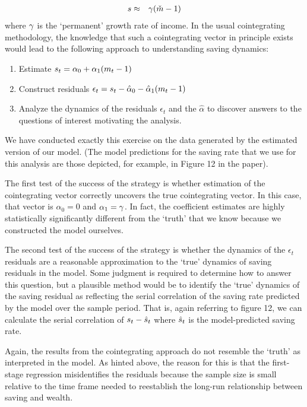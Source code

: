\begin{eqnarray}
  s & \approx & \gamma (\check{m}-1)
\end{eqnarray}
where $\gamma$ is the `permanent' growth rate of income.  In the usual cointegrating methodology, the knowledge
that such a cointegrating vector in principle exists would lead to the following approach to
understanding saving dynamics:
\begin{enumerate}
\item Estimate $s_{t} = \alpha_{0} + \alpha_{1} (m_{t}-1)$
\item Construct residuals $\epsilon_{t} = s_{t} - \hat{\alpha}_{0} - \hat{\alpha}_{1} (m_{t}-1)$
\item Analyze the dynamics of the residuals $\epsilon_{t}$ and the $\hat{\alpha}$ to discover answers to the questions
of interest motivating the analysis.
\end{enumerate}

We have conducted exactly this exercise on the data generated by the estimated version of our model.  (The model predictions for
the saving rate that we use for this analysis are those depicted, for example, in Figure 12 in the paper).

The first test of the success of the strategy is whether estimation of the cointegrating vector correctly uncovers the
true cointegrating vector.  In this case, that vector is $\alpha_{0}=0$ and $\alpha_{1} = \gamma$.  In fact, the
coefficient estimates are highly statistically significantly different from the `truth' that we know because we
constructed the model ourselves.  %

The second test of the success of the strategy is whether the dynamics of the $\epsilon_{t}$ residuals are a reasonable
approximation to the `true' dynamics of saving residuals in the model.  Some judgment is required to determine how
to answer this question, but a plausible method would be to identify the `true' dynamics of the saving residual as reflecting the serial
correlation of the saving rate predicted by the model over the sample period.  That is, again referring to figure 12,
we can calculate the serial correlation of $s_{t}-\hat{s}_{t}$ where $\hat{s}_{t}$ is the model-predicted saving rate.

Again, the results from the cointegrating approach do not resemble the
`truth' as interpreted in the
model.  %
As hinted above, the reason for this is that the first-stage
regression misidentifies the residuals because the sample size is
small relative to the time frame needed to reestablish the long-run
relationship between saving and wealth.

